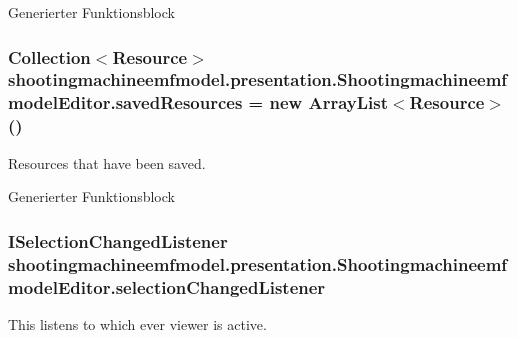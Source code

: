 Generierter Funktionsblock \hypertarget{classshootingmachineemfmodel_1_1presentation_1_1_shootingmachineemfmodel_editor_a80a06dd2f7dbaed42044fadca8dc3eb1}{
\subsubsection[{saved\-Resources}]{\setlength{\rightskip}{0pt plus 5cm}Collection$<$Resource$>$ shootingmachineemfmodel.\-presentation.\-Shootingmachineemfmodel\-Editor.\-saved\-Resources = new Array\-List$<$Resource$>$()\hspace{0.3cm}{\ttfamily [protected]}}}\label{classshootingmachineemfmodel_1_1presentation_1_1_shootingmachineemfmodel_editor_a80a06dd2f7dbaed42044fadca8dc3eb1}
Resources that have been saved.

Generierter Funktionsblock \hypertarget{classshootingmachineemfmodel_1_1presentation_1_1_shootingmachineemfmodel_editor_a68d9ace346daee5f9e536efe481f27b2}{
\subsubsection[{selection\-Changed\-Listener}]{\setlength{\rightskip}{0pt plus 5cm}I\-Selection\-Changed\-Listener shootingmachineemfmodel.\-presentation.\-Shootingmachineemfmodel\-Editor.\-selection\-Changed\-Listener\hspace{0.3cm}{\ttfamily [protected]}}}\label{classshootingmachineemfmodel_1_1presentation_1_1_shootingmachineemfmodel_editor_a68d9ace346daee5f9e536efe481f27b2}
This listens to which ever viewer is active.

